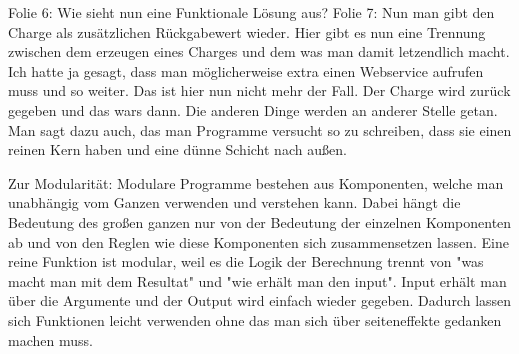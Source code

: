 \begin{frame}
Folie 6: Wie sieht nun eine Funktionale Lösung aus?
Folie 7: Nun man gibt den Charge als zusätzlichen Rückgabewert wieder.
Hier gibt es nun eine Trennung zwischen dem erzeugen eines Charges und dem was man damit letzendlich macht. Ich hatte ja gesagt, dass man möglicherweise extra einen Webservice aufrufen muss und so weiter. Das ist hier nun nicht mehr der Fall. Der Charge wird zurück gegeben und das wars dann. Die anderen Dinge werden an anderer Stelle getan. Man sagt dazu auch, das man Programme versucht so zu schreiben, dass sie einen reinen Kern haben und eine dünne Schicht nach außen. 

Zur Modularität: Modulare Programme bestehen aus Komponenten, welche man unabhängig vom Ganzen verwenden und verstehen kann. Dabei hängt die Bedeutung des großen ganzen nur von der Bedeutung der einzelnen Komponenten ab und von den Reglen wie diese Komponenten sich zusammensetzen lassen. Eine reine Funktion ist modular, weil es die Logik der Berechnung trennt von "was macht man mit dem Resultat" und 
"wie erhält man den input". Input erhält man über die Argumente und der Output wird einfach wieder gegeben. Dadurch lassen sich Funktionen leicht verwenden ohne das man sich über seiteneffekte gedanken machen muss. 
	
	\end{frame}